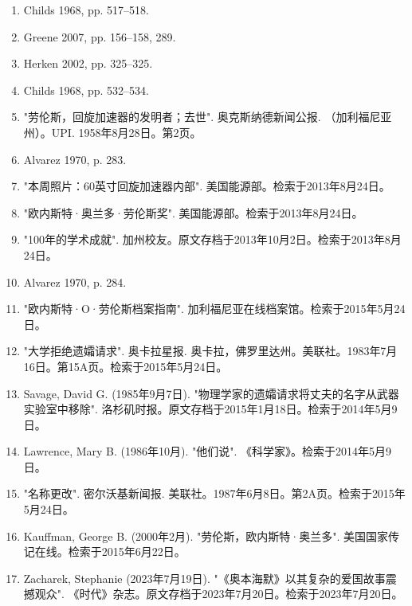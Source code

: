 \begin{enumerate}
\item Childs 1968, pp. 517–518.
\item Greene 2007, pp. 156–158, 289.
\item Herken 2002, pp. 325–325.
\item Childs 1968, pp. 532–534.
\item "劳伦斯，回旋加速器的发明者；去世". 奥克斯纳德新闻公报. （加利福尼亚州）。UPI. 1958年8月28日。第2页。
\item Alvarez 1970, p. 283.
\item "本周照片：60英寸回旋加速器内部". 美国能源部。检索于2013年8月24日。
\item "欧内斯特·奥兰多·劳伦斯奖". 美国能源部。检索于2013年8月24日。
\item "100年的学术成就". 加州校友。原文存档于2013年10月2日。检索于2013年8月24日。
\item Alvarez 1970, p. 284.
\item "欧内斯特·O·劳伦斯档案指南". 加利福尼亚在线档案馆。检索于2015年5月24日。
\item "大学拒绝遗孀请求". 奥卡拉星报. 奥卡拉，佛罗里达州。美联社。1983年7月16日。第15A页。检索于2015年5月24日。
\item Savage, David G. (1985年9月7日). "物理学家的遗孀请求将丈夫的名字从武器实验室中移除". 洛杉矶时报。原文存档于2015年1月18日。检索于2014年5月9日。
\item Lawrence, Mary B. (1986年10月). "他们说". 《科学家》。检索于2014年5月9日。
\item "名称更改". 密尔沃基新闻报. 美联社。1987年6月8日。第2A页。检索于2015年5月24日。
\item Kauffman, George B. (2000年2月). "劳伦斯，欧内斯特·奥兰多". 美国国家传记在线。检索于2015年6月22日。
\item Zacharek, Stephanie (2023年7月19日). "《奥本海默》以其复杂的爱国故事震撼观众". 《时代》杂志。原文存档于2023年7月20日。检索于2023年7月20日。
\end{enumerate}
